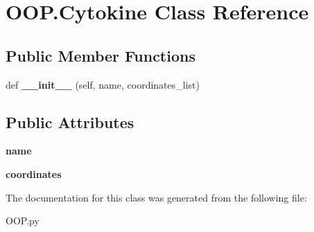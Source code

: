 \hypertarget{class_o_o_p_1_1_cytokine}{}\section{O\+O\+P.\+Cytokine Class Reference}
\label{class_o_o_p_1_1_cytokine}
\subsection*{Public Member Functions}
\begin{DoxyCompactItemize}
\item 
\mbox{\label{class_o_o_p_1_1_cytokine_ac53d9c48326010876cfdd9bce36ada17}} 
def {\bfseries \+\_\+\+\_\+init\+\_\+\+\_\+} (self, name, coordinates\+\_\+list)
\end{DoxyCompactItemize}
\subsection*{Public Attributes}
\begin{DoxyCompactItemize}
\item 
\mbox{\label{class_o_o_p_1_1_cytokine_af2fe54ba5c82aa5f78350862c074de96}} 
{\bfseries name}
\item 
\mbox{\label{class_o_o_p_1_1_cytokine_ae556f06a8a499b990f0e4f49bd80f09a}} 
{\bfseries coordinates}
\end{DoxyCompactItemize}


The documentation for this class was generated from the following file\+:\begin{DoxyCompactItemize}
\item 
O\+O\+P.\+py\end{DoxyCompactItemize}
